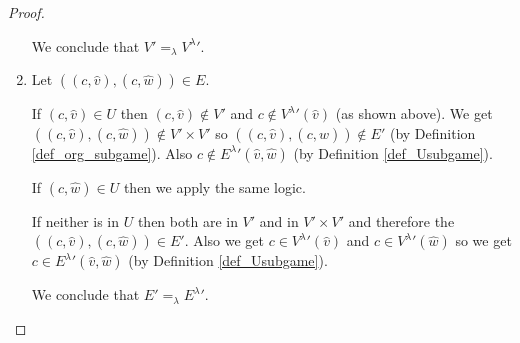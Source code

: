 \begin{lemma}
\begin{proof}
\begin{enumerate}
			We conclude that $V' =_\lambda {V^\lambda}'$.
			\item 
			
			Let $((c,\hat{v}),(c,\hat{w})) \in E$.
			
			If $(c,\hat{v}) \in U$ then $(c,\hat{v}) \notin V'$ and $c \notin {V^\lambda}'(\hat{v})$ (as shown above). We get $((c,\hat{v}),(c,\hat{w})) \notin V' \times V'$ so $((c,\hat{v}),(c,\hat{w})) \notin E'$ (by Definition \ref{def_org_subgame}). Also $c \notin {E^\lambda}'(\hat{v},\hat{w})$ (by Definition \ref{def_Usubgame}).
			
			If $(c,\hat{w}) \in U$ then we apply the same logic.
			
			If neither is in $U$ then both are in $V'$ and in $V' \times V'$ and therefore the $((c,\hat{v}),(c,\hat{w})) \in E'$. Also we get $c \in {V^\lambda}'(\hat{v})$ and $c \in {V^\lambda}'(\hat{w})$ so we get $c \in {E^\lambda}'(\hat{v},\hat{w})$ (by Definition \ref{def_Usubgame}).
			
			We conclude that $E' =_\lambda {E^\lambda}'$.
		\end{enumerate}
	\end{proof}
\end{lemma}


